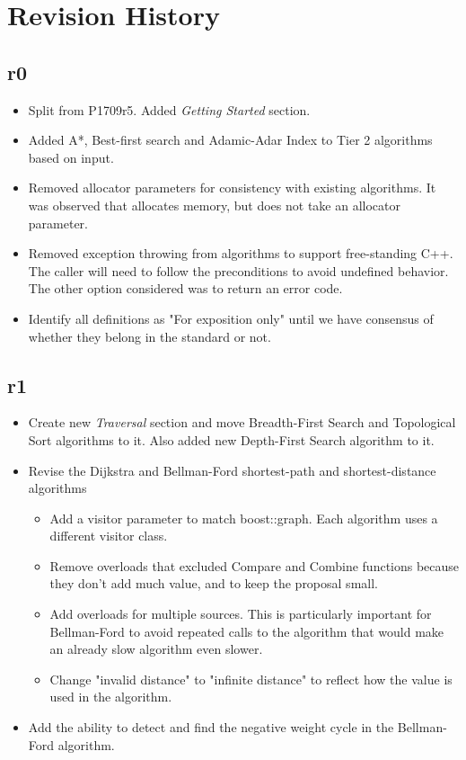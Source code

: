 \section{Revision History}

\subsection*{\paperno r0}

\begin{itemize}
      \item Split from P1709r5. Added \textit{Getting Started} section.
      \item Added A*, Best-first search and Adamic-Adar Index to Tier 2 algorithms based on input.
      \item Removed allocator parameters for consistency with existing algorithms. It was observed that  
            allocates memory, but does not take an allocator parameter.
      \item Removed exception throwing from algorithms to support free-standing C++. The caller will need to
            follow the preconditions to avoid undefined behavior. The other option considered was to return
            an error code.
      \item Identify all  definitions as "For exposition only" until we have consensus of whether they 
            belong in the standard or not.
\end{itemize}

\subsection*{\paperno r1}
\begin{itemize}
      \item Create new \textit{Traversal} section and move Breadth-First Search and Topological Sort algorithms to it.
            Also added new Depth-First Search algorithm to it.
      \item Revise the Dijkstra and Bellman-Ford shortest-path and shortest-distance algorithms
            \begin{itemize}
                  \item Add a visitor parameter to match boost::graph. Each algorithm uses a different visitor class.
                  \item Remove overloads that excluded Compare and Combine functions because they don't add much value,
                        and to keep the proposal small.
                  \item Add overloads for multiple sources. This is particularly important for Bellman-Ford to avoid
                        repeated calls to the algorithm that would make an already slow algorithm even slower.
                  \item Change "invalid distance" to "infinite distance" to reflect how the value is used 
                        in the algorithm.
            \end{itemize}
      \item Add the ability to detect and find the negative weight cycle in the Bellman-Ford algorithm.
\end{itemize}
